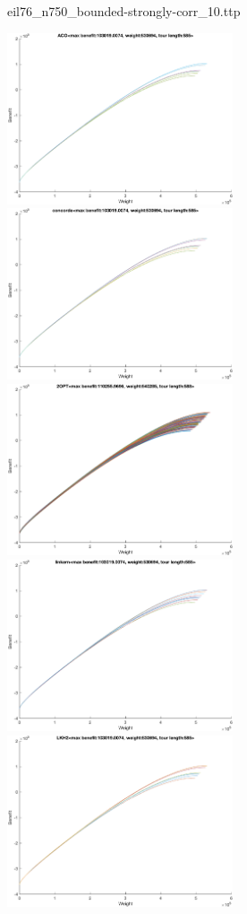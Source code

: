 \documentclass{article}
\begin{document}
\newpage
eil76\_n750\_bounded-strongly-corr\_10.ttp

\noindent
\includegraphics[width=0.5\textwidth]{eil76figs/eil76_n750_bounded-strongly-corr_10.ttp.aco.txt.eps}
\includegraphics[width=0.5\textwidth]{eil76figs/eil76_n750_bounded-strongly-corr_10.ttp.con.txt.eps}
\includegraphics[width=0.5\textwidth]{eil76figs/eil76_n750_bounded-strongly-corr_10.ttp.inv.txt.eps}
\includegraphics[width=0.5\textwidth]{eil76figs/eil76_n750_bounded-strongly-corr_10.ttp.lkh.txt.eps}
\includegraphics[width=0.5\textwidth]{eil76figs/eil76_n750_bounded-strongly-corr_10.ttp.lkh2.txt.eps}
\end{document}
